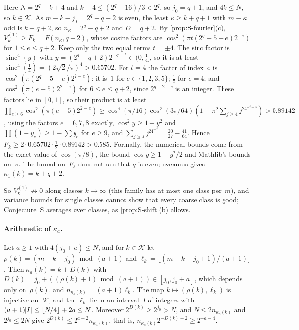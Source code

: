 \begin{outline}
Here $N=2^q+k+4$ and $k+4\le(2^q+16)/3<2^q$, so $j_0=q+1$, and $4k\le N$, so $k\in\mathcal K$. As $m-k-j_0=2^q-q+2$ is even,
the least $\kappa\ge k+q+1$ with $m-\kappa$ odd is $k+q+2$, so $n_\kappa=2^q-q+2$ and $D=q+2$. By
\cref{prop:S-fourier}(c), $V^{(1)}_k\ge F_k=F(n_\kappa,q+2)$, whose cosine factors are $\cos^2(\pi t(2^q+5-e)2^{-e})$ for
$1\le e\le q+2$. Keep only the two equal terms $t=\pm4$. The sinc factor is $\operatorname{sinc}^4(y)$ with
$y=(2^q-q+2)2^{-q-2}\in(0,\frac14]$, so it is at least $\operatorname{sinc}^4(\frac14)=(2\sqrt2/\pi)^4>0.65702$. For $t=4$
the factor of index~$e$ is $\cos^2(\pi(2^q+5-e)2^{2-e})$: it is~$1$ for $e\in\{1,2,3,5\}$; $\frac12$ for $e=4$; and
$\cos^2(\pi(e-5)2^{2-e})$ for $6\le e\le q+2$, since $2^{q+2-e}$ is an integer. These factors lie in $[0,1]$, so their
product is at least
$\prod_{e\ge6}\cos^2(\pi(e-5)2^{2-e})\ge\cos^4(\pi/16)\cos^2(3\pi/64)(1-\pi^2\sum_{j\ge4}j^24^{-j-3})>0.89142$, using the
factors $e=6,7,8$ exactly, $\cos^2y\ge1-y^2$ and $\prod(1-y_e)\ge1-\sum y_e$ for $e\ge9$, and
$\sum_{j\ge4}j^24^{-j}=\frac{20}{27}-\frac{41}{64}$. Hence
$F_k\ge2\cdot0.65702\cdot\frac12\cdot0.89142>0.585$.
Formally, the numerical bounds come from the exact value of $\cos(\pi/8)$, the bound $\cos y\ge1-y^2/2$ and Mathlib's
bounds on~$\pi$. The bound on~$F_k$ does not use that $q$ is even; evenness gives $\kappa_1(k)=k+q+2$.
\end{outline}

So $V^{(1)}_k\not\to0$ along classes $k\to\infty$ (this family has at most one class per~$m$), and variance bounds for
single classes cannot show that every coarse class is good; Conjecture~S averages over classes, as \cref{prop:S-shift}(b)
allows.

\paragraph{Arithmetic of $\kappa_a$.} Let $a\ge1$ with $4(j_0+a)\le N$, and for $k\in\mathcal K$ let
$\rho(k)=(m-k-j_0)\bmod(a+1)$ and $\ell_k=\lfloor(m-k-j_0+1)/(a+1)\rfloor$. Then $\kappa_a(k)=k+D(k)$ with
$D(k)=j_0+((\rho(k)+1)\bmod(a+1))\in[j_0,j_0+a]$, which depends only on~$\rho(k)$, and $n_{\kappa_a(k)}=(a+1)\ell_k$. The
map $k\mapsto(\rho(k),\ell_k)$ is injective on~$\mathcal K$, and the $\ell_k$ lie in an interval~$I$ of integers with
$(a+1)\lvert I \rvert\le\lfloor N/4\rfloor+2a\le N$. Moreover $2^{D(k)}\ge2^{j_0}>N$, and $N\le2n_{\kappa_a(k)}$ and
$2^{j_0}\le2N$ give $2^{D(k)}\le2^{a+2}n_{\kappa_a(k)}$, that is, $n_{\kappa_a(k)}2^{-D(k)-2}\ge2^{-a-4}$.

